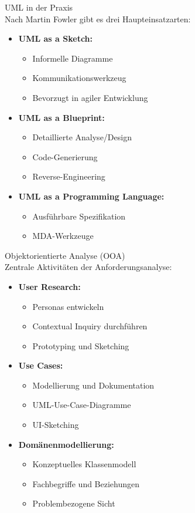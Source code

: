 \begin{concept}{UML in der Praxis}\\
Nach Martin Fowler gibt es drei Haupteinsatzarten:
\begin{itemize}
    \item \textbf{UML as a Sketch:}
    \begin{itemize}
        \item Informelle Diagramme
        \item Kommunikationswerkzeug
        \item Bevorzugt in agiler Entwicklung
    \end{itemize}
    \item \textbf{UML as a Blueprint:}
    \begin{itemize}
        \item Detaillierte Analyse/Design
        \item Code-Generierung
        \item Reverse-Engineering
    \end{itemize}
    \item \textbf{UML as a Programming Language:}
    \begin{itemize}
        \item Ausführbare Spezifikation
        \item MDA-Werkzeuge
    \end{itemize}
\end{itemize}
\end{concept}

\begin{concept}{Objektorientierte Analyse (OOA)}\\
Zentrale Aktivitäten der Anforderungsanalyse:
\begin{itemize}
    \item \textbf{User Research:}
    \begin{itemize}
        \item Personas entwickeln
        \item Contextual Inquiry durchführen
        \item Prototyping und Sketching
    \end{itemize}
    \item \textbf{Use Cases:}
    \begin{itemize}
        \item Modellierung und Dokumentation
        \item UML-Use-Case-Diagramme
        \item UI-Sketching
    \end{itemize}
    \item \textbf{Domänenmodellierung:}
    \begin{itemize}
        \item Konzeptuelles Klassenmodell
        \item Fachbegriffe und Beziehungen
        \item Problembezogene Sicht
    \end{itemize}
\end{itemize}
\end{concept}


